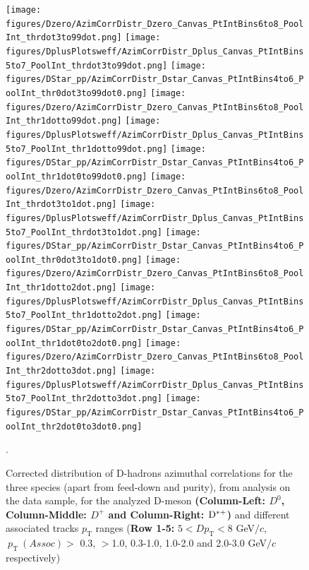\begin{figure}[hp]
\centering
{\texttt{[image: figures/Dzero/AzimCorrDistr\_Dzero\_Canvas\_PtIntBins6to8\_PoolInt\_thrdot3to99dot.png]}}
{\texttt{[image: figures/DplusPlotsweff/AzimCorrDistr\_Dplus\_Canvas\_PtIntBins5to7\_PoolInt\_thrdot3to99dot.png]}}
{\texttt{[image: figures/DStar\_pp/AzimCorrDistr\_Dstar\_Canvas\_PtIntBins4to6\_PoolInt\_thr0dot3to99dot0.png]}}
{\texttt{[image: figures/Dzero/AzimCorrDistr\_Dzero\_Canvas\_PtIntBins6to8\_PoolInt\_thr1dotto99dot.png]}}
{\texttt{[image: figures/DplusPlotsweff/AzimCorrDistr\_Dplus\_Canvas\_PtIntBins5to7\_PoolInt\_thr1dotto99dot.png]}}
{\texttt{[image: figures/DStar\_pp/AzimCorrDistr\_Dstar\_Canvas\_PtIntBins4to6\_PoolInt\_thr1dot0to99dot0.png]}}
{\texttt{[image: figures/Dzero/AzimCorrDistr\_Dzero\_Canvas\_PtIntBins6to8\_PoolInt\_thrdot3to1dot.png]}}
{\texttt{[image: figures/DplusPlotsweff/AzimCorrDistr\_Dplus\_Canvas\_PtIntBins5to7\_PoolInt\_thrdot3to1dot.png]}}
{\texttt{[image: figures/DStar\_pp/AzimCorrDistr\_Dstar\_Canvas\_PtIntBins4to6\_PoolInt\_thr0dot3to1dot0.png]}}
{\texttt{[image: figures/Dzero/AzimCorrDistr\_Dzero\_Canvas\_PtIntBins6to8\_PoolInt\_thr1dotto2dot.png]}}
{\texttt{[image: figures/DplusPlotsweff/AzimCorrDistr\_Dplus\_Canvas\_PtIntBins5to7\_PoolInt\_thr1dotto2dot.png]}}
{\texttt{[image: figures/DStar\_pp/AzimCorrDistr\_Dstar\_Canvas\_PtIntBins4to6\_PoolInt\_thr1dot0to2dot0.png]}}
{\texttt{[image: figures/Dzero/AzimCorrDistr\_Dzero\_Canvas\_PtIntBins6to8\_PoolInt\_thr2dotto3dot.png]}}
{\texttt{[image: figures/DplusPlotsweff/AzimCorrDistr\_Dplus\_Canvas\_PtIntBins5to7\_PoolInt\_thr2dotto3dot.png]}}
{\texttt{[image: figures/DStar\_pp/AzimCorrDistr\_Dstar\_Canvas\_PtIntBins4to6\_PoolInt\_thr2dot0to3dot0.png]}}
\caption{Corrected distribution of D-hadrons azimuthal correlations for the three species (apart from feed-down and purity), from analysis on the data sample, for the analyzed D-meson \textbf{(Column-Left: $D^0$, Column-Middle: $D^+$ and Column-Right: ${\rm D^{*+}}$)} and different associated tracks $p_\text{T}$ ranges (\textbf{Row 1-5:} $5 < D p_\text{T} < 8$ GeV$/c$, $ \ p_\text{T}~(Assoc)>$ 0.3, $>$1.0, 0.3-1.0, 1.0-2.0 and 2.0-3.0 GeV$/c$ respectively)}.
\label{fig:DataD0DpDs2}
\end{figure}

\clearpage
\newpage


